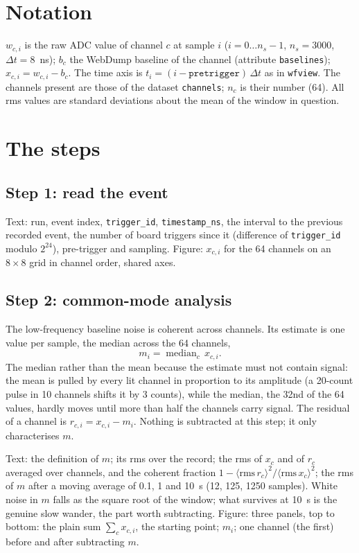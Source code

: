 \documentclass[11pt]{article}
\newcommand{\code}[1]{\texttt{#1}}
\newcommand{\us}{\textmu s}
\begin{document}
\section{Notation}

$w_{c,i}$ is the raw ADC value of channel $c$ at sample $i$ ($i = 0 \dots
n_s-1$, $n_s = 3000$, $\Delta t = 8$~ns); $b_c$ the WebDump baseline of the
channel (attribute \code{baselines}); $x_{c,i} = w_{c,i} - b_c$. The time
axis is $t_i = (i - \code{pretrigger})\,\Delta t$ as in \code{wfview}. The
channels present are those of the dataset \code{channels}; $n_c$ is their
number (64). All rms values are standard deviations about the mean of the
window in question.

\section{The steps}

\subsection{Step 1: read the event}

Text: run, event index, \code{trigger\_id}, \code{timestamp\_ns}, the
interval to the previous recorded event, the number of board triggers since
it (difference of \code{trigger\_id} modulo $2^{24}$), pre-trigger and
sampling. Figure: $x_{c,i}$ for the 64 channels on an $8\times8$ grid in
channel order, shared axes.

\subsection{Step 2: common-mode analysis}
\label{sec:cm}

The low-frequency baseline noise is coherent across channels. Its estimate
is one value per sample, the median across the 64 channels,
\[
  m_i = \operatorname{median}_c\, x_{c,i}.
\]
The median rather than the mean because the estimate must not contain
signal: the mean is pulled by every lit channel in proportion to its
amplitude (a 20-count pulse in 10 channels shifts it by 3 counts), while
the median, the 32nd of the 64 values, hardly moves until more than half
the channels carry signal. The residual of a channel is $r_{c,i} = x_{c,i}
- m_i$. Nothing is subtracted at this step; it only characterises $m$.

Text: the definition of $m$; its rms over the record; the rms of $x_c$
and of $r_c$ averaged over channels, and the coherent fraction $1 -
\langle\mathrm{rms}\,r_c\rangle^2 / \langle\mathrm{rms}\,x_c\rangle^2$;
the rms of $m$ after a moving average of 0.1, 1 and 10~\us{} (12, 125,
1250 samples). White noise in $m$ falls as the square root of the window;
what survives at 10~\us{} is the genuine slow wander, the part worth
subtracting. Figure: three panels, top to bottom: the plain sum $\sum_c
x_{c,i}$, the starting point; $m_i$; one channel (the first) before and
after subtracting $m$.
\end{document}
